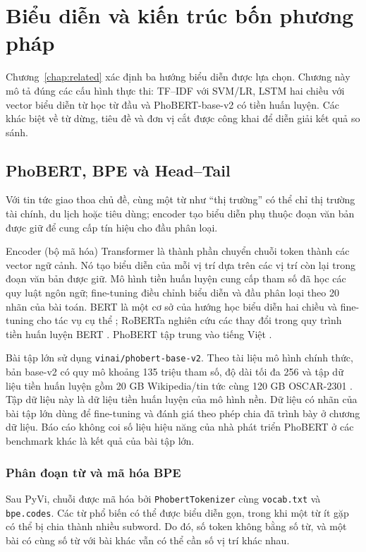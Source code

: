 \chapter{Biểu diễn và kiến trúc bốn phương pháp}
\label{chap:model}
Chương~\ref{chap:related} xác định ba hướng biểu diễn được lựa chọn. Chương này mô tả đúng các cấu hình thực thi: TF--IDF với SVM/LR, LSTM hai chiều với vector biểu diễn từ học từ đầu và PhoBERT-base-v2 có tiền huấn luyện. Các khác biệt về từ dừng, tiêu đề và đơn vị cắt được công khai để diễn giải kết quả so sánh.

\FloatBarrier
\section{PhoBERT, BPE và Head--Tail}
Với tin tức giao thoa chủ đề, cùng một từ như ``thị trường'' có thể chỉ thị trường tài chính, du lịch hoặc tiêu dùng; encoder tạo biểu diễn phụ thuộc đoạn văn bản được giữ để cung cấp tín hiệu cho đầu phân loại.

Encoder (bộ mã hóa) Transformer là thành phần chuyển chuỗi token thành các vector ngữ cảnh. Nó tạo biểu diễn của mỗi vị trí dựa trên các vị trí còn lại trong đoạn văn bản được giữ. Mô hình tiền huấn luyện cung cấp tham số đã học các quy luật ngôn ngữ; fine-tuning điều chỉnh biểu diễn và đầu phân loại theo 20 nhãn của bài toán. BERT là một cơ sở của hướng học biểu diễn hai chiều và fine-tuning cho tác vụ cụ thể \citep{bert}; RoBERTa nghiên cứu các thay đổi trong quy trình tiền huấn luyện BERT \citep{roberta}. PhoBERT tập trung vào tiếng Việt \citep{phobert}.

Bài tập lớn sử dụng \texttt{vinai/phobert-base-v2}. Theo tài liệu mô hình chính thức, bản base-v2 có quy mô khoảng 135 triệu tham số, độ dài tối đa 256 và tập dữ liệu tiền huấn luyện gồm 20 GB Wikipedia/tin tức cùng 120 GB OSCAR-2301 \citep{phobertcard}. Tập dữ liệu này là dữ liệu tiền huấn luyện của mô hình nền. Dữ liệu có nhãn của bài tập lớn dùng để fine-tuning và đánh giá theo phép chia đã trình bày ở chương dữ liệu. Báo cáo không coi số liệu hiệu năng của nhà phát triển PhoBERT ở các benchmark khác là kết quả của bài tập lớn.

\subsection{Phân đoạn từ và mã hóa BPE}
Sau PyVi, chuỗi được mã hóa bởi \texttt{PhobertTokenizer} cùng \texttt{vocab.txt} và \texttt{bpe.codes}. Các từ phổ biến có thể được biểu diễn gọn, trong khi một từ ít gặp có thể bị chia thành nhiều subword. Do đó, số token không bằng số từ, và một bài có cùng số từ với bài khác vẫn có thể cần số vị trí khác nhau.

